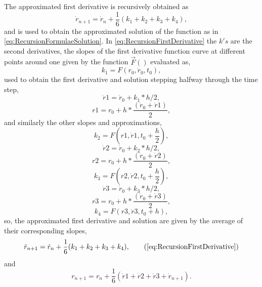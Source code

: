 \documentclass[12pt]{article}
\begin{document}
The approximated first derivative is recursively obtained as
\begin{equation}
  \label{eq:RecursionFirstDerivative}
  \dot{r}_{n+1} = \dot{r}_{n} + \frac{1}{6}(k_{1}+k_{2}+k_{3}+k_{4}),
\end{equation}
and is used to obtain the approximated solution of the function as in
\eqref{eq:RecursionFormulaeSolution}. In
\eqref{eq:RecursionFirstDerivative} the \(k's\) are the second
derivatives, the slopes of the first derivative function curve at
different points around one given by the function \(\vec{F}()\)
evaluated as,
\begin{equation}
  \label{eq:First1}
  k_{1}= F(r_{0},\dot{r}_{0},t_{0}),
\end{equation}
used to obtain the first derivative and solution stepping halfway
through the time step,
\begin{equation}
  \label{eq:velocity1}
  \dot{r}1 = \dot{r}_{0} + k_{1}*h/2,
\end{equation}
\begin{equation}
  \label{eq:Sol_1}
  r1 = r_{0} + h*\frac{(\dot{r}_{0}+\dot{r}1)}{2},
\end{equation}
and similarly the other slopes and approximations,
\begin{equation}
  \label{eq:slope2}
  k_{2}= F(r1, \dot{r}1, t_{0}+\frac{h}{2}),
\end{equation}
\begin{equation}
  \label{eq:velocity2}
  \dot{r}2 = \dot{r}_{0} + k_{2}*h/2,
\end{equation}
\begin{equation}
  \label{eq:Sol_2}
  r2 = r_{0} + h*\frac{(\dot{r}_{0}+\dot{r}2)}{2},
\end{equation}
\begin{equation}
  \label{eq:slope3}
  k_{3}= F(r2, \dot{r}2, t_{0}+\frac{h}{2}),
\end{equation}
\begin{equation}
  \label{eq:velocity2}
  \dot{r}3 = \dot{r}_{0} + k_{3}*h/2,
\end{equation}
\begin{equation}
  \label{eq:Sol_2}
  r3 = r_{0} + h*\frac{(\dot{r}_{0}+\dot{r}3)}{2},
\end{equation}
\begin{equation}
  \label{eq:slope4}
  k_{4}= F(r3,\dot{r}3,t_{0}+h),
\end{equation}
so, the approximated first derivative and solution are given by the
average of their corresponding slopes,
\begin{equation}
  \dot{r}_{n+1} = \dot{r}_{n} + \frac{1}{6}(k_{1}+k_{2}+k_{3}+k_{4}), \tag{\ref{eq:RecursionFirstDerivative}}
\end{equation}
and
\begin{equation}
   \label{eq:SODE_Sol}
  r_{n+1} = r_{n} + \frac{1}{6}(\dot{r}1+\dot{r}2+\dot{r}3+\dot{r}_{n+1}).
\end{equation}
\end{document}
